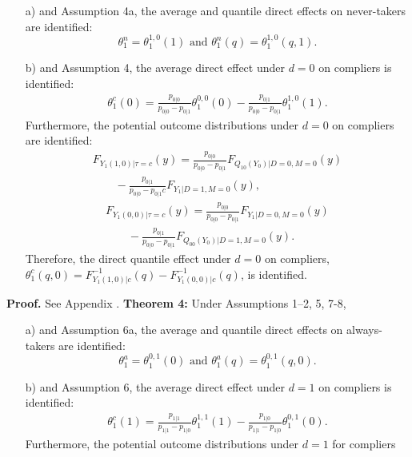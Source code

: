 \documentclass[a4paper,12pt]{article}
\begin{document}
 \doublespacing \pagestyle{plain}
\begin{itemize}
\item[a)] and Assumption 4a, the average and quantile direct effects on never-takers are identified:
\begin{equation*}
\theta_1^n= \theta_1^{1,0}(1) \mbox{ and } \theta_1^n(q)= \theta_1^{1,0}(q,1).
\end{equation*}
\item[b)] and Assumption 4, the average direct effect under $d = 0$ on compliers is identified:
\begin{align*}
\displaystyle \theta_1^{c}(0) = \frac{p_{0|0}}{p_{0|0} - p_{0|1}} \theta_1^{0,0}(0)   - \frac{p_{0|1}}{p_{0|0} - p_{0|1}} \theta_1^{1,0}(1) .
\end{align*}
Furthermore, the potential outcome distributions under $d = 0$ on compliers are identified:
\begin{equation} \begin{array}{rl} \displaystyle
 F_{Y_{1}(1,0)|\tau=c}(y) = \displaystyle \frac{p_{0|0}}{p_{0|0} - p_{0|1}}  F_{Q_{10}(Y_{0})|D=0,M=0}(y) \\ \displaystyle \qquad - \frac{p_{0|1}}{ p_{0|0} - p_{0|1}c}  F_{Y_1|D=1,M=0}(y), \end{array}
 \end{equation}
 \begin{equation}
 \begin{array}{rl}\displaystyle
F_{Y_{1}(0,0)|\tau=c}(y) = \displaystyle \frac{p_{0|0}}{p_{0|0} - p_{0|1}} F_{Y_{1}|D=0,M=0}(y) \\ \displaystyle \qquad - \frac{p_{0|1} }{p_{0|0} - p_{0|1}}F_{Q_{00}(Y_{0})|D=1,M=0}(y)  . 
\end{array}
\end{equation}
Therefore, the direct quantile effect under $d = 0$ on compliers, $\theta_1^{c}(q,0) = F_{Y_{1}(1,0)|c}^{-1}(q)-F_{Y_{1}(0,0)|c}^{-1}(q)$, is identified.
\end{itemize}
\textbf{Proof.} See Appendix .
\noindent \textbf{Theorem 4:} Under Assumptions 1–2, 5, 7-8,
\begin{itemize}
\item[a)] and Assumption 6a, the average and quantile direct effects on
always-takers are identified:
\begin{equation*}
\theta_1^a= \theta_1^{0,1}(0) \mbox{ and } \theta_1^a(q)= \theta_1^{0,1}(q,0).
\end{equation*}
\item[b)] and Assumption 6, the average direct effect under $d = 1$ on compliers is identified:
\begin{align*}
\theta_{1}^{c}(1) = \frac{p_{1|1}}{ p_{1|1} - p_{1|0}} \theta_1^{1,1}(1) -\frac{p_{1|0}}{p_{1|1} - p_{1|0}}\theta_1^{0,1}(0).
\end{align*}
Furthermore, the potential outcome distributions under $d = 1$ for compliers
\end{itemize}
\end{document}
